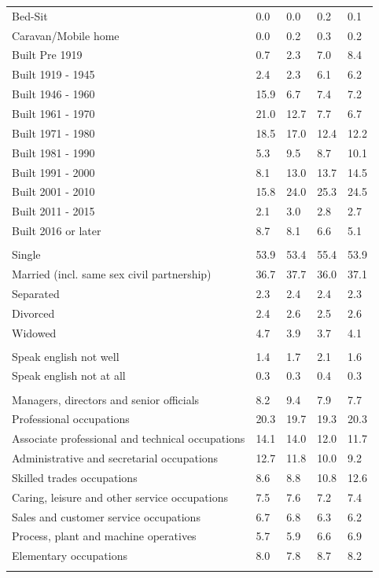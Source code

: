\documentclass{article}
\begin{document}
\begin{table}[h]
\begin{tabular}{KTTTT}
Bed-Sit & 0.0& 0.0& 0.2& 0.1\\
Caravan/Mobile home & 0.0& 0.2& 0.3& 0.2\\
    \hline
Built Pre 1919 & 0.7& 2.3& 7.0& 8.4\\
Built 1919 - 1945 & 2.4& 2.3& 6.1& 6.2\\
Built  1946 - 1960 & 15.9&  6.7&  7.4&  7.2\\
Built  1961 - 1970 & 21.0& 12.7&  7.7&  6.7\\
Built  1971 - 1980 & 18.5& 17.0& 12.4& 12.2\\
Built  1981 - 1990 &  5.3&  9.5&  8.7& 10.1\\
Built  1991 - 2000 &  8.1& 13.0& 13.7& 14.5\\
Built  2001 - 2010 & 15.8& 24.0& 25.3& 24.5\\
Built  2011 - 2015 & 2.1& 3.0& 2.8& 2.7\\
Built  2016 or later & 8.7& 8.1& 6.6& 5.1\\
\hline
    \\
    \hline
Single & 53.9& 53.4& 55.4& 53.9\\
Married (incl. same sex civil partnership) & 36.7& 37.7& 36.0& 37.1\\
Separated  & 2.3& 2.4& 2.4& 2.3\\
Divorced  & 2.4& 2.6& 2.5& 2.6\\
Widowed & 4.7& 3.9& 3.7& 4.1\\
\hline
    \\ 
    \hline
Speak english not well & 1.4& 1.7& 2.1& 1.6\\
Speak english not at all & 0.3& 0.3& 0.4& 0.3\\
\hline
    \\
    \hline
Managers, directors and senior officials & 8.2& 9.4& 7.9& 7.7\\
Professional occupations & 20.3& 19.7& 19.3& 20.3\\
Associate professional and technical occupations & 14.1& 14.0& 12.0& 11.7\\
Administrative and secretarial occupations & 12.7& 11.8& 10.0&  9.2\\
Skilled trades occupations &  8.6&  8.8& 10.8& 12.6\\
Caring, leisure and other service occupations & 7.5& 7.6& 7.2& 7.4\\
Sales and customer service occupations & 6.7& 6.8& 6.3& 6.2\\
Process, plant and machine operatives & 5.7& 5.9& 6.6& 6.9\\
Elementary occupations & 8.0& 7.8& 8.7& 8.2\\
\hline
\end{tabular}
\end{table}
\end{document}

